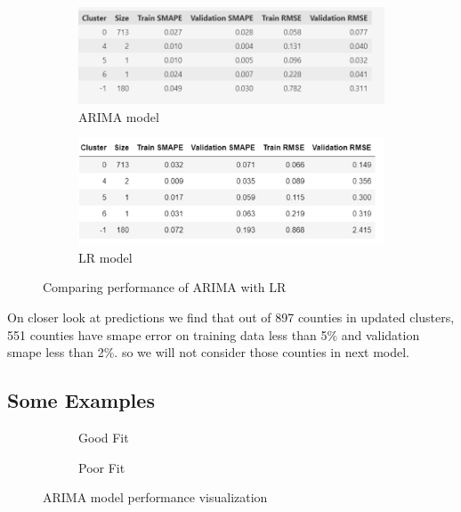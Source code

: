 \documentclass{article}
\begin{document}
\begin{figure}[h]
	\centering
	\vspace{1em}
	\begin{subfigure}{0.6\textwidth}
	\includegraphics[width=\linewidth]{images/arima_results}
	\caption{ARIMA model}
	\label{fig:arima}
	\end{subfigure}

	\begin{subfigure}{0.6\textwidth}
	\centering
	\includegraphics[width=\linewidth]{images/benchmark_arima_with_lr}
	\caption{LR model}
	\label{fig:lr_vs_arima}
	\end{subfigure}
	\caption{Comparing performance of ARIMA with LR}
	\label{fig:lr_arima_both}
\end{figure}

On closer look at predictions we find that out of 897 counties in updated clusters, 551 counties have smape error on training data less than 5\% and validation smape less than 2\%. so we will not consider those counties in next model.

\subsection{Some Examples}

\begin{figure}[h]
	\centering
	\vspace{1em}
	\begin{subfigure}{0.45\textwidth}
		\caption{Good Fit}
		\label{fig:arima_good}
	\end{subfigure}
	\begin{subfigure}{0.45\textwidth}
		\caption{Poor Fit}
		\label{fig:arima_poor}
	\end{subfigure}
	\caption{ARIMA model performance visualization}
	\label{fig:arima_both}
\end{figure}
\end{document}
